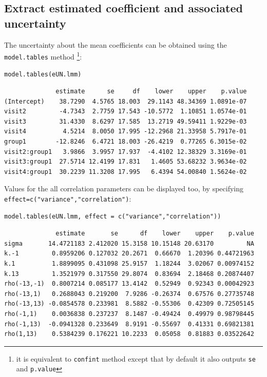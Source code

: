 \documentclass[12pt]{article}
\begin{document}
\subsection{Extract estimated coefficient and associated uncertainty}
\label{sec:org6c5f021}

The uncertainty about the mean coefficients can be obtained using the
\texttt{model.tables} method \footnote{it is equivalent to \texttt{confint} method
except that by default it also outputs \texttt{se} and \texttt{p.value}}:
\lstset{language=r,label= ,caption= ,captionpos=b,numbers=none}
\begin{lstlisting}
model.tables(eUN.lmm)
\end{lstlisting}

\begin{verbatim}
              estimate      se     df    lower    upper    p.value
(Intercept)    38.7290  4.5765 18.003  29.1143 48.34369 1.0891e-07
visit2         -4.7343  2.7759 17.543 -10.5772  1.10851 1.0574e-01
visit3         31.4330  8.6297 17.585  13.2719 49.59411 1.9229e-03
visit4          4.5214  8.0050 17.995 -12.2968 21.33958 5.7917e-01
group1        -12.8246  6.4721 18.003 -26.4219  0.77265 6.3015e-02
visit2:group1   3.9866  3.9957 17.937  -4.4102 12.38329 3.3169e-01
visit3:group1  27.5714 12.4199 17.831   1.4605 53.68232 3.9634e-02
visit4:group1  30.2239 11.3208 17.995   6.4394 54.00840 1.5624e-02
\end{verbatim}


Values for the all correlation parameters can be displayed
too, by specifying \texttt{effect=c("variance","correlation")}:
\lstset{language=r,label= ,caption= ,captionpos=b,numbers=none}
\begin{lstlisting}
model.tables(eUN.lmm, effect = c("variance","correlation"))
\end{lstlisting}

\begin{verbatim}
              estimate       se      df    lower    upper    p.value
sigma       14.4721183 2.412020 15.3158 10.15148 20.63170         NA
k.-1         0.8959206 0.127032 20.2671  0.66670  1.20396 0.44721963
k.1          1.8899095 0.431098 25.9157  1.18244  3.02067 0.00974152
k.13         1.3521979 0.317550 29.8074  0.83694  2.18468 0.20874407
rho(-13,-1)  0.8007214 0.085177 13.4142  0.52949  0.92343 0.00042923
rho(-13,1)   0.2688043 0.219200  7.9286 -0.26374  0.67576 0.27735748
rho(-13,13) -0.0854578 0.233981  8.5882 -0.55306  0.42309 0.72505145
rho(-1,1)    0.0036838 0.237237  8.1487 -0.49424  0.49979 0.98798445
rho(-1,13)  -0.0941328 0.233649  8.9191 -0.55697  0.41331 0.69821381
rho(1,13)    0.5384239 0.176221 10.2233  0.05058  0.81883 0.03522642
\end{verbatim}
\end{document}
